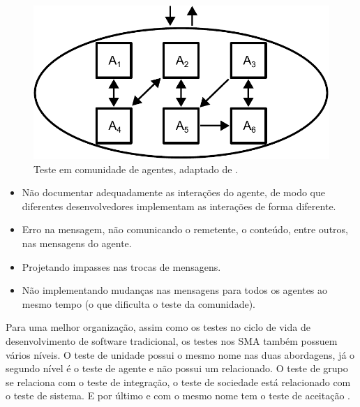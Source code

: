 \begin{figure}[ht]
\centering
\includegraphics[scale=0.7]{imagens/community_agents.pdf}
\caption{Teste em comunidade de agentes, adaptado de \cite{rouff2002test}.}
\label{comunity}
\end{figure}

\begin{itemize}
\item Não documentar adequadamente as interações do agente, de modo que diferentes desenvolvedores implementam as interações de forma diferente.
\item Erro na mensagem, não comunicando o remetente, o conteúdo, entre outros, nas mensagens do agente.
\item Projetando impasses nas trocas de mensagens.
\item Não implementando mudanças nas mensagens para todos os agentes ao mesmo tempo (o que dificulta o teste da comunidade).
\end{itemize}

Para uma melhor organização, assim como os testes no ciclo de vida de desenvolvimento de software tradicional, os testes nos SMA também possuem vários níveis. O teste de unidade possui o mesmo nome nas duas abordagens, já o segundo nível é o teste de agente e não possui um relacionado. O teste de  grupo se relaciona com o teste de integração, o teste de sociedade está relacionado com o teste de sistema. E por último e com o mesmo nome tem o teste de aceitação \cite{houhamdi2011multi}. 

